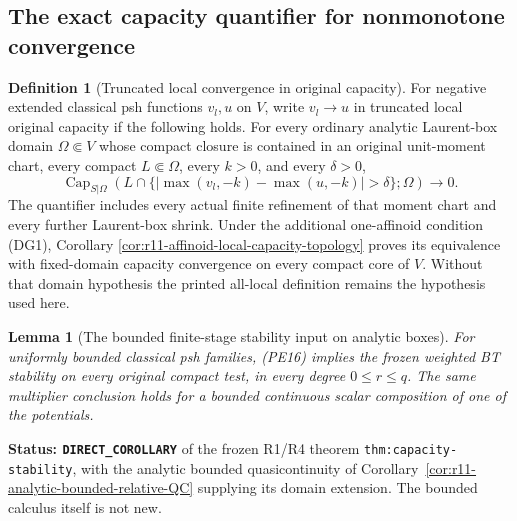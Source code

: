 \documentclass[11pt,a4paper]{article}
\numberwithin{equation}{section}
\newtheorem{lemma}[theorem]{Lemma}
\theoremstyle{definition}
\newtheorem{definition}[theorem]{Definition}
\theoremstyle{remark}
\begin{document}
\subsection{The exact capacity quantifier for nonmonotone convergence}

\begin{definition}[Truncated local convergence in original capacity]
\label{def:r11-truncated-local-capacity}
For negative extended classical psh functions $v_l,u$ on $V$,
write $v_l\to u$ in truncated local original capacity if the
following holds. For every ordinary analytic Laurent-box domain
$\Omega\Subset V$ whose compact closure is contained in an
original unit-moment chart, every compact $L\Subset\Omega$,
every $k>0$, and every $\delta>0$,
\[
 \operatorname{Cap}_{S|\Omega}
 \left(L\cap\{|\max(v_l,-k)-\max(u,-k)|>\delta\};\Omega\right)
                                               \longrightarrow0.
 \tag{PE16}
\]
The quantifier includes every actual finite refinement of that
moment chart and every further Laurent-box shrink. Under the
additional one-affinoid condition (DG1), Corollary
\ref{cor:r11-affinoid-local-capacity-topology} proves its equivalence
with fixed-domain capacity convergence on every compact core of $V$.
Without that domain hypothesis the printed all-local definition
remains the hypothesis used here.
\end{definition}

\begin{lemma}[The bounded finite-stage stability input on analytic boxes]
\label{lem:r11-bounded-analytic-capacity-stability}
For uniformly bounded classical psh families, (PE16) implies the
frozen weighted BT stability on every original compact test, in
every degree $0\leq r\leq q$. The same multiplier conclusion
holds for a bounded continuous scalar composition of one of
the potentials.
\end{lemma}

\noindent\textbf{Status: \texttt{DIRECT\_COROLLARY}} of the
frozen R1/R4 theorem \texttt{thm:capacity-stability}, with the
analytic bounded quasicontinuity of
Corollary~\ref{cor:r11-analytic-bounded-relative-QC} supplying
its domain extension. The bounded calculus itself is not new.
\end{document}

